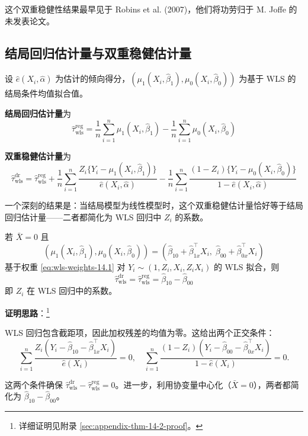 这个双重稳健性结果最早见于 Robins et al. (2007)，他们将功劳归于 M. Joffe 的未发表论文。

\subsection{结局回归估计量与双重稳健估计量}\label{sec:14-3-2}

设 $\hat{e}(X_i, \hat{\alpha})$ 为估计的倾向得分，$(\mu_1(X_i, \hat{\beta}_1), \mu_0(X_i, \hat{\beta}_0))$ 为基于 WLS 的结局条件均值拟合值。

\textbf{结局回归估计量}为
\[
\hat{\tau}_{\text{wls}}^{\text{reg}}
= \frac{1}{n}\sum_{i=1}^n \mu_1(X_i, \hat{\beta}_1)
  - \frac{1}{n}\sum_{i=1}^n \mu_0(X_i, \hat{\beta}_0)
\]

\textbf{双重稳健估计量}为
\[
\hat{\tau}_{\text{wls}}^{\text{dr}}
= \hat{\tau}_{\text{wls}}^{\text{reg}}
  + \frac{1}{n}\sum_{i=1}^n \frac{Z_i\{Y_i - \mu_1(X_i, \hat{\beta}_1)\}}{\hat{e}(X_i, \hat{\alpha})}
  - \frac{1}{n}\sum_{i=1}^n \frac{(1-Z_i)\{Y_i - \mu_0(X_i, \hat{\beta}_0)\}}{1 - \hat{e}(X_i, \hat{\alpha})}
\]

一个深刻的结果是：当结局模型为线性模型时，这个双重稳健估计量恰好等于结局回归估计量——二者都简化为 WLS 回归中 $Z_i$ 的系数。

\begin{Theorem}[定理 14.2 — 双重稳健性]\label{chap14-thm:double-robust}
若 $\bar{X}=0$ 且
\[
(\mu_1(X_i, \hat{\beta}_1), \mu_0(X_i, \hat{\beta}_0))
= (\hat{\beta}_{10} + \hat{\beta}_{1x}^\top X_i, \; \hat{\beta}_{00} + \hat{\beta}_{0x}^\top X_i)
\]
基于权重 \cref{eq:wls-weights-14.1} 对 $Y_i \sim (1, Z_i, X_i, Z_i X_i)$ 的 WLS 拟合，则
\[
\hat{\tau}_{\text{wls}}^{\text{dr}}
= \hat{\tau}_{\text{wls}}^{\text{reg}}
= \hat{\beta}_{10} - \hat{\beta}_{00}
\]
即 $Z_i$ 在 WLS 回归中的系数。
\end{Theorem}

\textbf{证明思路}：\footnote{详细证明见附录 \cref{sec:appendix-thm-14-2-proof}。}

WLS 回归包含截距项，因此加权残差的均值为零。这给出两个正交条件：
\[
\sum_{i=1}^n \frac{Z_i(Y_i - \hat{\beta}_{10} - \hat{\beta}_{1x}^\top X_i)}{\hat{e}(X_i)} = 0,
\quad
\sum_{i=1}^n \frac{(1-Z_i)(Y_i - \hat{\beta}_{00} - \hat{\beta}_{0x}^\top X_i)}{1-\hat{e}(X_i)} = 0.
\]

这两个条件确保 $\hat{\tau}_{\text{wls}}^{\text{dr}} - \hat{\tau}_{\text{wls}}^{\text{reg}} = 0$。进一步，利用协变量中心化（$\bar{X}=0$），两者都简化为 $\hat{\beta}_{10} - \hat{\beta}_{00}$。

